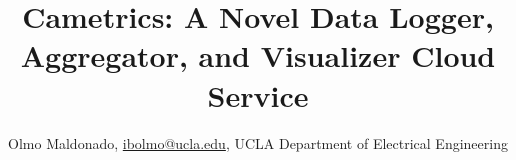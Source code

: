 \documentclass[10pt,a4paper,english]{article}
\title{}
\author{}
\date{}
\newlength{\locallinewidth}
\begin{document}
\setlength{\locallinewidth}{\linewidth}



\title{Cametrics: A Novel Data Logger, Aggregator, and Visualizer Cloud
Service}

\maketitle

\author{Olmo Maldonado, \href{mailto:ibolmo@ucla.edu}{ibolmo@ucla.edu},
UCLA Department of Electrical Engineering}

\maketitle


\pagebreak{}

\hypertarget{contents}{}
\end{document}
